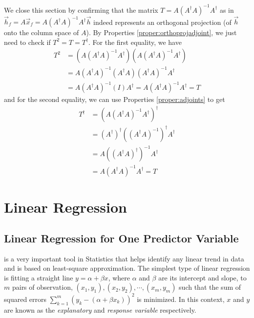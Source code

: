 We close this section by confirming that the matrix $T = A(A^\dag A)^{-1}A^\dag$ as in $\vec{h}_f = A\vec{x}_f = A(A^\dag A)^{-1}A^\dag \vec{h}$ indeed represents an orthogonal projection (of $\vec{h}$ onto the column space of $A$). By Properties \ref{proper:orthoprojadjoint}, we just need to check if $T^2 = T = T^\dag$. For the first equality, we have
\begin{align*}
T^2 &= (A(A^\dag A)^{-1}A^\dag)(A(A^\dag A)^{-1}A^\dag) \\
&= A(A^\dag A)^{-1}(A^\dag A)(A^\dag A)^{-1}A^\dag \\
&= A(A^\dag A)^{-1}(I)A^\dag = A(A^\dag A)^{-1}A^\dag = T
\end{align*}
and for the second equality, we can use Properties \ref{proper:adjoints} to get
\begin{align*}
T^\dag &= (A(A^\dag A)^{-1}A^\dag)^\dag \\
&= (A^\dag)^\dag((A^\dag A)^{-1})^\dag A^\dag \\
&= A ((A^\dag A)^\dag)^{-1} A^\dag \\
&= A (A^\dag A)^{-1} A^\dag = T
\end{align*}

\section{Linear Regression}
\subsection{Linear Regression for One Predictor Variable}

 is a very important tool in Statistics that helps identify any linear trend in data and is based on least-square approximation. The simplest type of linear regression is fitting a straight line $y = \alpha + \beta x$, where $\alpha$ and $\beta$ are its intercept and slope, to $m$ pairs of observation, $(x_1, y_1), (x_2, y_2), \cdots, (x_m, y_m)$ such that the sum of squared errors $\sum_{k=1}^m (y_k - (\alpha + \beta x_k))^2$ is minimized. In this context, $x$ and $y$ are known as the \textit{explanatory} and \textit{response variable} respectively.\par

